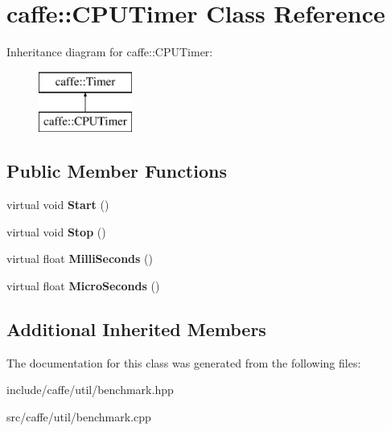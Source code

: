 \hypertarget{classcaffe_1_1CPUTimer}{}\section{caffe\+:\+:C\+P\+U\+Timer Class Reference}
\label{classcaffe_1_1CPUTimer}
Inheritance diagram for caffe\+:\+:C\+P\+U\+Timer\+:\begin{figure}[H]
\begin{center}
\leavevmode
\includegraphics[height=2.000000cm]{classcaffe_1_1CPUTimer}
\end{center}
\end{figure}
\subsection*{Public Member Functions}
\begin{DoxyCompactItemize}
\item 
virtual void {\bfseries Start} ()\hypertarget{classcaffe_1_1CPUTimer_ad7d3835101e57b25373389d45b000233}{}\label{classcaffe_1_1CPUTimer_ad7d3835101e57b25373389d45b000233}

\item 
virtual void {\bfseries Stop} ()\hypertarget{classcaffe_1_1CPUTimer_a44b519b603c185b0d625d229065d07b0}{}\label{classcaffe_1_1CPUTimer_a44b519b603c185b0d625d229065d07b0}

\item 
virtual float {\bfseries Milli\+Seconds} ()\hypertarget{classcaffe_1_1CPUTimer_a08572d87bd635c3e7bdeee2b264640e5}{}\label{classcaffe_1_1CPUTimer_a08572d87bd635c3e7bdeee2b264640e5}

\item 
virtual float {\bfseries Micro\+Seconds} ()\hypertarget{classcaffe_1_1CPUTimer_a1830b20c7d04afaf8cbbd3569b54c3ee}{}\label{classcaffe_1_1CPUTimer_a1830b20c7d04afaf8cbbd3569b54c3ee}

\end{DoxyCompactItemize}
\subsection*{Additional Inherited Members}


The documentation for this class was generated from the following files\+:\begin{DoxyCompactItemize}
\item 
include/caffe/util/benchmark.\+hpp\item 
src/caffe/util/benchmark.\+cpp\end{DoxyCompactItemize}
